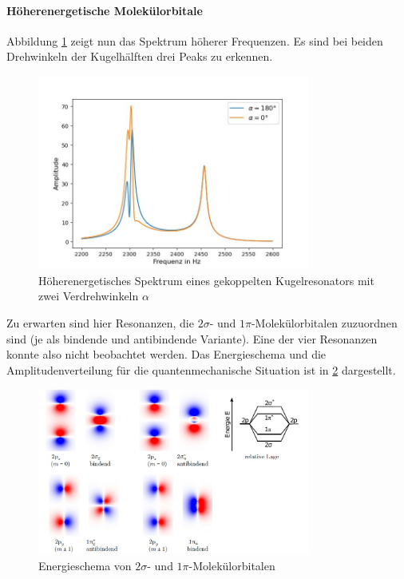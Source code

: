 \documentclass[../main.tex]{subfiles}
\begin{document}
    \paragraph{Höherenergetische Molekülorbitale}
        Abbildung \ref{fig:IV_e_Spektren} zeigt nun das Spektrum höherer Frequenzen. Es sind bei beiden Drehwinkeln der Kugelhälften drei Peaks zu erkennen.
        
        \begin{figure}[H]
            \centering
            \includegraphics[width=0.8\textwidth]{Bilddateien/Auswertung/IV_e_Spektren.jpg}
            \caption{Höherenergetisches Spektrum eines gekoppelten Kugelresonators mit zwei Verdrehwinkeln $\alpha$}
            \label{fig:IV_e_Spektren}
        \end{figure}

        Zu erwarten sind hier Resonanzen, die $2\sigma$- und $1\pi$-Molekülorbitalen zuzuordnen sind (je als bindende und antibindende Variante). Eine der vier Resonanzen konnte also nicht beobachtet werden. Das Energieschema und die Amplitudenverteilung für die quantenmechanische Situation ist in \ref{fig:IV_e_Energieschema} dargestellt.

        \begin{figure}[H]
            \centering
            \includegraphics[width=0.8\textwidth]{Bilddateien/Auswertung/IV_e_Energieschema.jpg}
            \caption{Energieschema von $2\sigma$- und $1\pi$-Molekülorbitalen}
            \label{fig:IV_e_Energieschema}
        \end{figure}
\end{document}
